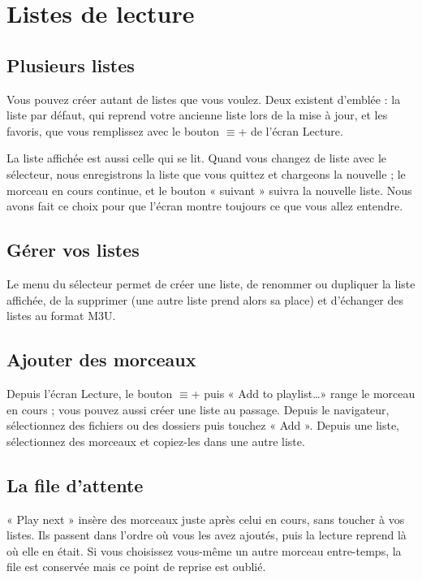 \chapter{Listes de lecture}\label{chap:listes}

\section{Plusieurs listes}
Vous pouvez créer autant de listes que vous voulez. Deux existent d'emblée : la liste par défaut, qui reprend votre
ancienne liste lors de la mise à jour, et les favoris, que vous remplissez avec le bouton $\equiv$+ de l'écran
Lecture.

La liste affichée est aussi celle qui se lit. Quand vous changez de liste avec le sélecteur, nous enregistrons la
liste que vous quittez et chargeons la nouvelle ; le morceau en cours continue, et le bouton « suivant » suivra la
nouvelle liste. Nous avons fait ce choix pour que l'écran montre toujours ce que vous allez entendre.


\section{Gérer vos listes}
Le menu du sélecteur permet de créer une liste, de renommer ou dupliquer la liste affichée, de la supprimer (une
autre liste prend alors sa place) et d'échanger des listes au format M3U.

\section{Ajouter des morceaux}
Depuis l'écran Lecture, le bouton $\equiv$+ puis « Add to playlist\dots » range le morceau en cours ; vous pouvez
aussi créer une liste au passage. Depuis le navigateur, sélectionnez des fichiers ou des dossiers puis touchez
« Add ». Depuis une liste, sélectionnez des morceaux et copiez-les dans une autre liste.

\section{La file d'attente}\label{sec:file}
« Play next » insère des morceaux juste après celui en cours, sans toucher à vos listes. Ils passent dans l'ordre où
vous les avez ajoutés, puis la lecture reprend là où elle en était. Si vous choisissez vous-même un autre morceau
entre-temps, la file est conservée mais ce point de reprise est oublié.

